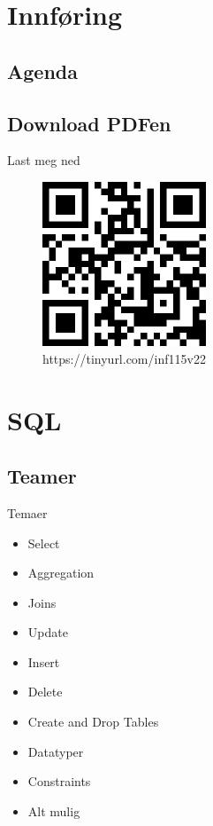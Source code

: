 
\begin{frame}[t,plain]
    \titlepage
\end{frame}

\section{Innføring}
\subsection*{Agenda}
\begin{frame}
    \tableofcontents
\end{frame}

\subsection*{Download PDFen}
\begin{frame}{Last meg ned}
    \begin{figure}
        \centering
        \includegraphics[height = 4.9cm]{images/downloadqr.png}
        \caption{https://tinyurl.com/inf115v22}
        \label{fig:qrcode}
    \end{figure}
\end{frame}

\section{SQL}
\subsection*{Teamer}
\begin{frame}{Temaer}
\begin{itemize}
    \item Select
    \item Aggregation
    \item Joins
    \item Update
    \item Insert
    \item Delete
    \item Create and Drop Tables
    \item Datatyper
    \item Constraints
    \item Alt mulig
\end{itemize}
\end{frame}

